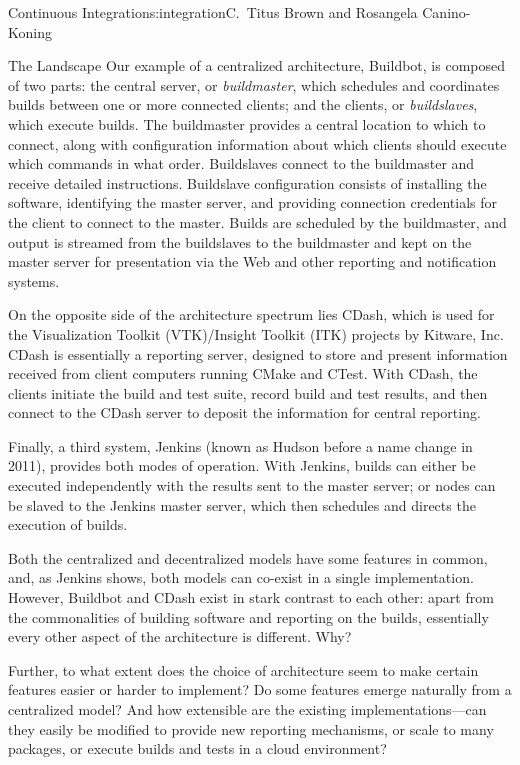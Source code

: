 \begin{aosachapter}{Continuous Integration}{s:integration}{C.\ Titus Brown and Rosangela Canino-Koning}
\begin{aosasect1}{The Landscape}
Our example of a centralized architecture, Buildbot, is composed of
two parts: the central server, or \emph{buildmaster}, which schedules and
coordinates builds between one or more connected clients; and the
clients, or \emph{buildslaves}, which execute builds. The buildmaster
provides a central location to which to connect, along with
configuration information about which clients should execute which
commands in what order. Buildslaves connect to the buildmaster and
receive detailed instructions. Buildslave configuration consists of
installing the software, identifying the master server, and providing
connection credentials for the client to connect to the master. Builds
are scheduled by the buildmaster, and output is streamed from the
buildslaves to the buildmaster and kept on the master server for
presentation via the Web and other reporting and notification systems.

On the opposite side of the architecture spectrum lies CDash, which is
used for the Visualization Toolkit (VTK)/Insight Toolkit (ITK)
projects by Kitware, Inc. CDash is essentially a reporting server,
designed to store and present information received from client
computers running CMake and CTest. With CDash, the clients initiate
the build and test suite, record build and test results, and then
connect to the CDash server to deposit the information for central
reporting.

Finally, a third system, Jenkins (known as Hudson before a name
change in 2011), provides both modes of operation. With Jenkins,
builds can either be executed independently with the results sent to
the master server; or nodes can be slaved to the Jenkins master
server, which then schedules and directs the execution of builds.

Both the centralized and decentralized models have some features in
common, and, as Jenkins shows, both models can co-exist in a single
implementation. However, Buildbot and CDash exist in stark contrast to
each other: apart from the commonalities of building software and
reporting on the builds, essentially every other aspect of the
architecture is different. Why?

Further, to what extent does the choice of architecture seem to make
certain features easier or harder to implement? Do some features
emerge naturally from a centralized model? And how extensible are the
existing implementations---can they easily be modified to provide new
reporting mechanisms, or scale to many packages, or execute builds and
tests in a cloud environment?


\end{aosasect1}
\end{aosachapter}
